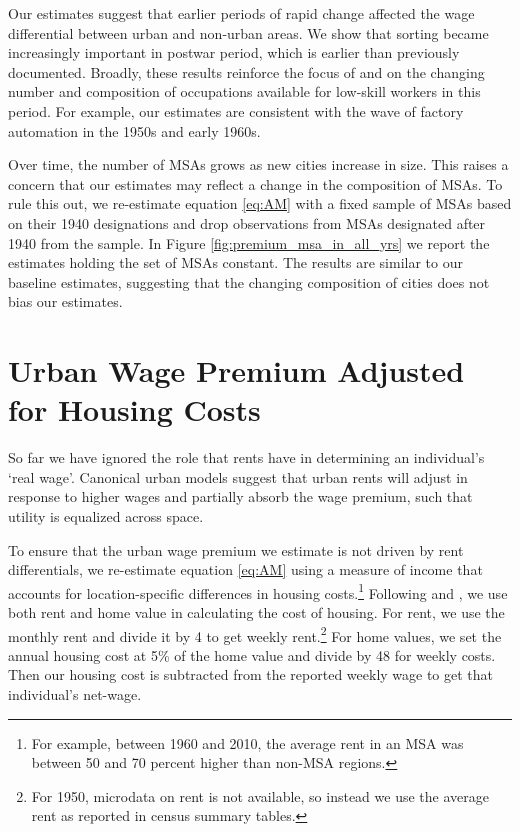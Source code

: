 \documentclass[12pt]{article}
\begin{document}
Our estimates suggest that earlier periods of rapid change affected the wage differential between urban and non-urban areas.
We show that sorting became increasingly important in postwar period, which is earlier than previously documented.
Broadly, these results reinforce the focus of \citet{autorWorkPastFuture} and \citet{papageorgiou2022occupational} on the changing number and composition of occupations available for low-skill workers in this period.
For example, our estimates are consistent with the wave of factory automation in the 1950s and early 1960s. 

Over time, the number of MSAs grows as new cities increase in size.
This raises a concern that our estimates may reflect a change in the composition of MSAs.
To rule this out, we re-estimate equation \eqref{eq:AM} with a fixed sample of MSAs based on their 1940 designations and drop observations from MSAs designated after 1940 from the sample.
In Figure \ref{fig:premium_msa_in_all_yrs} we report the estimates holding the set of MSAs constant.
The results are similar to our baseline estimates, suggesting that the changing composition of cities does not bias our estimates.    

\section{Urban Wage Premium Adjusted for Housing Costs}

So far we have ignored the role that rents have in determining an individual's `real wage'.
Canonical urban models suggest that urban rents will adjust in response to higher wages and partially absorb the wage premium, such that utility is equalized across space.  

To ensure that the urban wage premium we estimate is not driven by rent differentials, we re-estimate equation \eqref{eq:AM} using a measure of income that accounts for location-specific differences in housing costs.\footnote{
  For example, between 1960 and 2010, the average rent in an MSA was between 50 and 70 percent higher than non-MSA regions.
}
Following \citet{ganong2017has} and \citet{hoxie2020moving}, we use both rent and home value in calculating the cost of housing. 
For rent, we use the monthly rent and divide it by 4 to get weekly rent.\footnote{
  For 1950, microdata on rent is not available, so instead we use the average rent as reported in census summary tables.
}
For home values, we set the annual housing cost at 5\% of the home value and divide by 48 for weekly costs. 
Then our housing cost is subtracted from the reported weekly wage to get that individual's net-wage.
\end{document}
